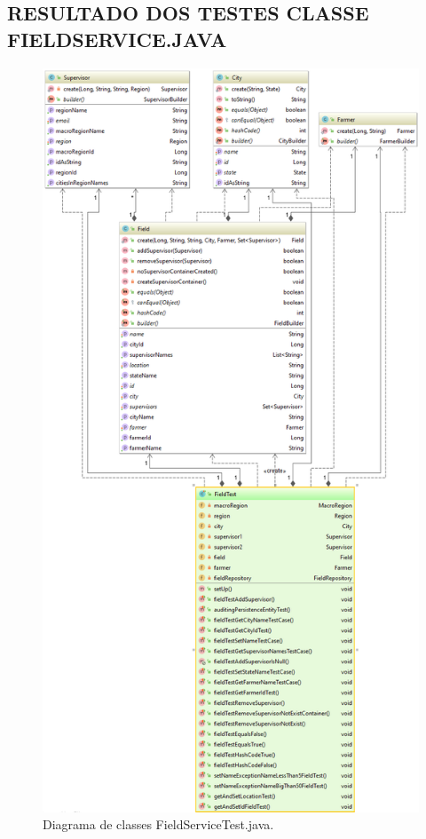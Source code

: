 \subsection{RESULTADO DOS TESTES CLASSE FIELDSERVICE.JAVA}


\begin{figure}[H]
	\centering
	\includegraphics[scale=0.5]{dados/figuras/PackagebaseTestField.png}
	\caption{Diagrama de classes FieldServiceTest.java.}
	\label{packFieldService}
\end{figure}

